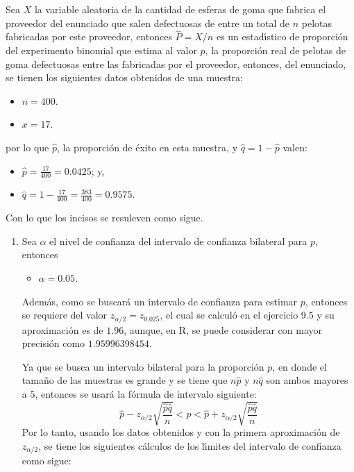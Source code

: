 \begin{solucion}
 Sea $X$ la variable aleatoria de la cantidad de esferas de goma que fabrica el proveedor del enunciado  que salen defectuosas de entre un total de $n$ pelotas fabricadas por este proveedor, entonces $\widehat{P} = X/n$ es un estad\'{\i}stico de proporci\'on del experimento binomial que estima al valor $p$, la proporci\'on real de pelotas de goma defectuosas entre las fabricadas por el proveedor, entonces, del enunciado, se tienen los siguientes datos obtenidos de una muestra:
 \begin{itemize}
  \item $n = 400$.
  \item $x = 17$.
 \end{itemize}
 por lo que $\hat{p}$, la proporci\'on de \'exito en esta muestra, y $\hat{q} = 1 - \hat{p}$ valen:
 \begin{itemize}
  \item $\hat{p} = \frac{17}{400} = 0.0425$; y,
  \item $\hat{q} = 1 - \frac{17}{400} = \frac{383}{400} = 0.9575$.
 \end{itemize}
 Con lo que los incisos se resuleven como sigue.
 \begin{enumerate}
  \item Sea $\alpha$ el nivel de confianza del intervalo de confianza bilateral para $p$, entonces
  \begin{itemize}
   \item $\alpha = 0.05$.
  \end{itemize}
  Adem\'as, como se buscar\'a un intervalo de confianza para estimar $p$, entonces se requiere del valor $z_{\alpha/2} = z_{0.025}$, el cual se calcul\'o en el ejercicio 9.5 y su aproximaci\'on es de $1.96$, aunque, en R, se puede considerar con mayor precisi\'on como $1.95996398454$.
  \par 
  Ya que se busca un intervalo bilateral para la proporci\'on $p$, en donde el tama\~no de las muestras es grande y se tiene que $n\hat{p}$ y $n\hat{q}$ son ambos mayores a $5$, entonces se usar\'a la f\'ormula de intervalo siguiente:
  \begin{equation*}
   \hat{p} - z_{\alpha/2}\sqrt{\frac{\hat{p}\hat{q}}{n}} < p < \hat{p} + z_{\alpha/2}\sqrt{\frac{\hat{p}\hat{q}}{n}}
  \end{equation*}
  Por lo tanto, usando los datos obtenidos y con la primera aproximaci\'on de $z_{\alpha/2}$, se tiene los siguientes c\'alculos de los l\'{\i}mites del intervalo de confianza como sigue:
  \begin{eqnarray*}

\end{eqnarray*}
\end{enumerate}
\end{solucion}
